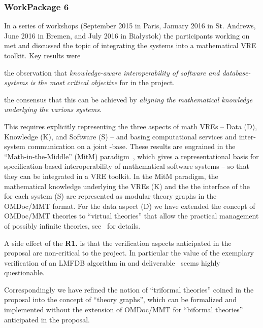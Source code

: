 \documentclass{deliverablereport}
\begin{document}
  
  \subsubsection{WorkPackage 6}
  In a series of workshops (September 2015 in Paris, January 2016 in St. Andrews, June
  2016 in Bremen, and July 2016 in Bia{\l}ystok) the participants working on
   met and discussed the topic of integrating the \pn systems into a
  mathematical VRE toolkit.  Key results were
  \begin{compactitem}[\bf R1.]
  \item the observation that \emph{knowledge-aware interoperability of software and
      database-systems is the most critical objective} for  in the \pn
    project.
  \item the consensus that this can be achieved by \emph{aligning the mathematical
      knowledge underlying the various systems}.
  \end{compactitem}
  This requires explicitly representing the three aspects of math VREs -- Data (D),
  Knowledge (K), and Software (S) -- and basing computational services and inter-system
  communication on a joint \DKS-base. These results are engrained in the
  ``Math-in-the-Middle'' (MitM) paradigm~\cite{DehKohKon:iop16}, which gives a
  representational basis for specification-based interoperability of mathematical software
  systems -- so that they can be integrated in a VRE toolkit. In the MitM paradigm, the
  mathematical knowledge underlying the VREs (K) and the the interface of the for each
  system (S) are represented as modular theory graphs in the OMDoc/MMT format. For the
  data aspect (D) we have extended the concept of OMDoc/MMT theories to ``virtual
  theories'' that allow the practical management of possibly infinite theories,
  see~\cite{ODK-D6.2} for details.

  A side effect of the \textbf{R1.} is that the verification aspects anticipated in the
  proposal are non-critical to the \pn project. In particular the value of the exemplary
  verification of an LMFDB algorithm in  and
  deliverable~ seems highly questionable.

  Correspondingly we have refined the notion of ``triformal theories'' coined in the
  proposal into the concept of ``\DKS theory graphs'', which can be formalized and
  implemented without the extension of OMDoc/MMT for ``biformal theories'' anticipated in
  the proposal.
\end{document}
